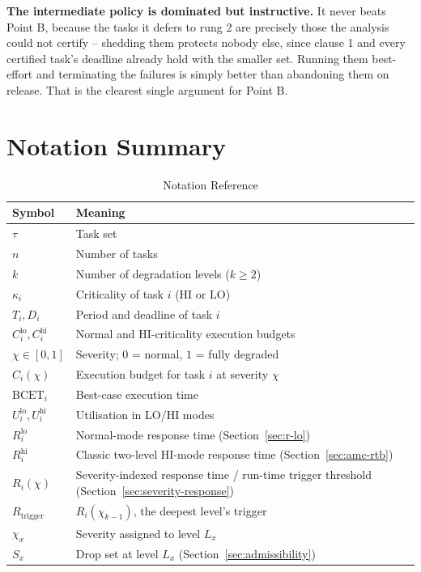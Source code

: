 \documentclass{article}
\begin{document}
\textbf{The intermediate policy is dominated but instructive.} It never beats
Point B, because the tasks it defers to rung 2 are precisely those the analysis
could not certify -- shedding them protects nobody else, since clause 1 and
every certified task's deadline already hold with the smaller set. Running them
best-effort and terminating the failures is simply better than abandoning them
on release. That is the clearest single argument for Point B.

\section{Notation Summary}

\begin{table}[h]
\centering
\caption{Notation Reference}
\begin{tabular}{ll}
\toprule
Symbol & Meaning \\
\midrule
$\tau$ & Task set \\
$n$ & Number of tasks \\
$k$ & Number of degradation levels ($k \geq 2$) \\
$\kappa_i$ & Criticality of task $i$ ($\mathrm{HI}$ or $\mathrm{LO}$) \\
$T_i, D_i$ & Period and deadline of task $i$ \\
$C_i^{\mathrm{lo}}, C_i^{\mathrm{hi}}$ & Normal and HI-criticality execution budgets \\
$\chi \in [0,1]$ & Severity; $0$ = normal, $1$ = fully degraded \\
$C_i(\chi)$ & Execution budget for task $i$ at severity $\chi$ \\
$\mathrm{BCET}_i$ & Best-case execution time \\
$U_i^{\mathrm{lo}}, U_i^{\mathrm{hi}}$ & Utilisation in LO/HI modes \\
$R_i^{\mathrm{lo}}$ & Normal-mode response time (Section~\ref{sec:r-lo}) \\
$R_i^{\mathrm{hi}}$ & Classic two-level HI-mode response time (Section~\ref{sec:amc-rtb}) \\
$R_i(\chi)$ & Severity-indexed response time / run-time trigger threshold (Section~\ref{sec:severity-response}) \\
$R_{\mathrm{trigger}}$ & $R_i(\chi_{k-1})$, the deepest level's trigger \\
$\chi_x$ & Severity assigned to level $L_x$ \\
$S_x$ & Drop set at level $L_x$ (Section~\ref{sec:admissibility}) \\

\end{tabular}
\end{table}
\end{document}
